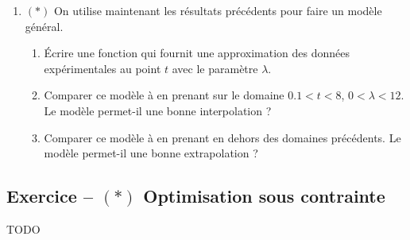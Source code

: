 \documentclass{article}
\newcounter{loop}
\newcounter{numEx}
\newcommand{\exo}[1]{
	\stepcounter{numEx}
	\setcounter{loop}{0}
	\subsection*{Exercice \arabic{numEx} -- #1}
}
\begin{document}
\begin{enumerate}
	\item $(*)$ On utilise maintenant les résultats précédents pour faire un modèle général.
	\begin{enumerate}
		\item Écrire une fonction  qui fournit une approximation des données expérimentales au point $t$ avec le paramètre $\lambda$.
		\item Comparer ce modèle à  en prenant  sur le domaine $0.1 < t < 8$, $0 < \lambda < 12$. Le modèle permet-il une bonne interpolation ?
		\item Comparer ce modèle à  en prenant  en dehors des domaines précédents. Le modèle permet-il une bonne extrapolation ?
	\end{enumerate}
	
\end{enumerate}


\exo{$(*)$ Optimisation sous contrainte}

{\Large\color{red} TODO}
\end{document}
